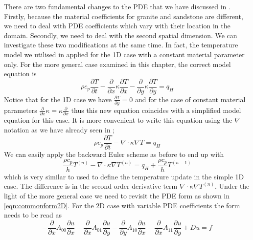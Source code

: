 There are two fundamental changes to the PDE that we have discussed in
. Firstly,
because the material coefficients for granite and sandstone are different, we
need to deal with 
PDE coefficients which vary with their location in the domain. Secondly, we
need to deal with the second spatial dimension. We can investigate these two
modifications at the same time. 
In fact, the temperature model  we utilised in
 applied for the 
1D case with a constant material parameter only. For the more general case
examined in this chapter, the correct model equation is 
\begin{equation}
\rho c_p \frac{\partial T}{\partial t} -  \frac{\partial }{\partial x}
\kappa \frac{\partial T}{\partial x} -  \frac{\partial }{\partial y} \kappa
\frac{\partial T}{\partial y} = q_H 
\label{eqn:hd2}
\end{equation}
Notice that for the 1D case we have $\frac{\partial T}{\partial y}=0$ and
for the case of constant material parameters $\frac{\partial }{\partial x}
\kappa = \kappa  \frac{\partial }{\partial x}$ thus this new equation coincides
with a simplified model equation for this case. It is more convenient 
to write this equation using the $\nabla$ notation as we have already seen in
;
\begin{equation}\label{eqn:Tform nabla}
\rho c_p \frac{\partial T}{\partial t} 
-\nabla \cdot \kappa \nabla T = q_H
\end{equation}
We can easily apply the backward Euler scheme as before to end up with 
\begin{equation}
\frac{\rho c_p}{h} T^{(n)} -\nabla \cdot \kappa \nabla T^{(n)}  =
q_H +  \frac{\rho c_p}{h} T^{(n-1)}
\label{eqn:hdgenf2}
\end{equation}
which is very similar to  used to define the temperature
update in the simple 1D case. 
The difference is in the second order derivative term
$\nabla \cdot \kappa \nabla T^{(n)}$. Under the light of the more general case
we need to revisit the \esc PDE form as shown in \ref{eqn:commonform2D}.
For the 2D case with variable PDE coefficients the form needs to be read as 
\begin{equation}\label{eqn:commonform2D 2}
-\frac{\partial }{\partial x} A_{00}\frac{\partial u}{\partial x} 
-\frac{\partial }{\partial x} A_{01}\frac{\partial u}{\partial y} 
-\frac{\partial }{\partial y} A_{10}\frac{\partial u}{\partial x} 
-\frac{\partial }{\partial x} A_{11}\frac{\partial u}{\partial y} 
+ Du = f
\end{equation}
